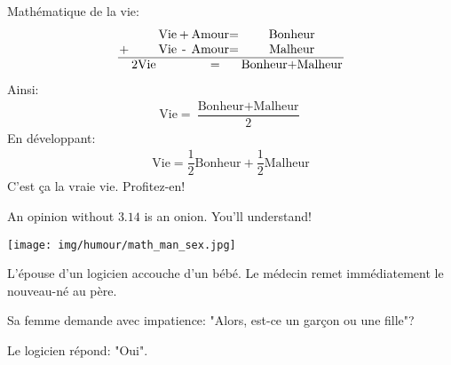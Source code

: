 	\begin{center}\underline{\hspace{5 cm}}\end{center}
	Mathématique de la vie:
	\begin{gather}
		\setlength{\tabcolsep}{1pt}
		\begin{tabular}{cccccc}
		& & \text{Vie} & + & \text{Amour}= & \text{Bonheur} \\
		$+$& & \text{Vie} & - & \text{Amour}= & \text{Malheur} \\ \hline
		&2\text{Vie}& & & = & \text{Bonheur}+\text{Malheur} \\
		\end{tabular}
	\end{gather}
	Ainsi:
	\begin{gather}
		\text{Vie}=\dfrac{\text{Bonheur}+\text{Malheur}}{2}
	\end{gather}
	En développant:
	\begin{gather}
		\text{Vie}=\dfrac{1}{2}\text{Bonheur}+\dfrac{1}{2}\text{Malheur}
	\end{gather}
	C'est ça la vraie vie. Profitez-en!
	
	\begin{center}\underline{\hspace{5 cm}}\end{center}
	
	An opinion without $3.14$ is an onion. You'll understand!
	
	\begin{center}\underline{\hspace{5 cm}}\end{center}

	\begin{center}
		\texttt{[image: img/humour/math\_man\_sex.jpg]}	
	\end{center}
	
	\begin{center}\underline{\hspace{5 cm}}\end{center}
	
	L'épouse d'un logicien accouche d'un bébé. Le médecin remet immédiatement le nouveau-né au père.

	Sa femme demande avec impatience: "Alors, est-ce un garçon ou une fille"?

	Le logicien répond: "Oui".

	\begin{center}\underline{\hspace{5 cm}}\end{center}
	
